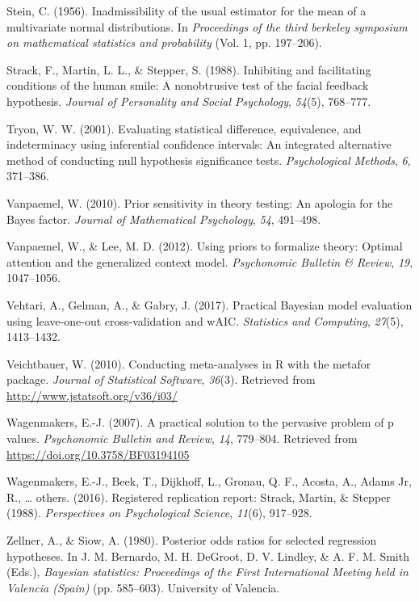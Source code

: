 \documentclass[english,man]{apa6}
\theoremstyle{definition}
\theoremstyle{definition}
\theoremstyle{remark}
\begin{document}
\hypertarget{ref-Stein:1956}{}
Stein, C. (1956). Inadmissibility of the usual estimator for the mean of
a multivariate normal distributions. In \emph{Proceedings of the third
berkeley symposium on mathematical statistics and probability} (Vol. 1,
pp. 197--206).

\hypertarget{ref-Strack:etal:1988}{}
Strack, F., Martin, L. L., \& Stepper, S. (1988). Inhibiting and
facilitating conditions of the human smile: A nonobtrusive test of the
facial feedback hypothesis. \emph{Journal of Personality and Social
Psychology}, \emph{54}(5), 768--777.

\hypertarget{ref-Tryon:2001}{}
Tryon, W. W. (2001). Evaluating statistical difference, equivalence, and
indeterminacy using inferential confidence intervals: An integrated
alternative method of conducting null hypothesis significance tests.
\emph{Psychological Methods}, \emph{6}, 371--386.

\hypertarget{ref-Vanpaemel:2010}{}
Vanpaemel, W. (2010). Prior sensitivity in theory testing: An apologia
for the Bayes factor. \emph{Journal of Mathematical Psychology},
\emph{54}, 491--498.

\hypertarget{ref-Vanpaemel:Lee:2012}{}
Vanpaemel, W., \& Lee, M. D. (2012). Using priors to formalize theory:
Optimal attention and the generalized context model. \emph{Psychonomic
Bulletin \& Review}, \emph{19}, 1047--1056.

\hypertarget{ref-Vehtari:etal:2017}{}
Vehtari, A., Gelman, A., \& Gabry, J. (2017). Practical Bayesian model
evaluation using leave-one-out cross-validation and wAIC.
\emph{Statistics and Computing}, \emph{27}(5), 1413--1432.

\hypertarget{ref-Veichtbauer:2010}{}
Veichtbauer, W. (2010). Conducting meta-analyses in R with the metafor
package. \emph{Journal of Statistical Software}, \emph{36}(3). Retrieved
from \url{http://www.jstatsoft.org/v36/i03/}

\hypertarget{ref-Wagenmakers:2007}{}
Wagenmakers, E.-J. (2007). A practical solution to the pervasive problem
of p values. \emph{Psychonomic Bulletin and Review}, \emph{14},
779--804. Retrieved from \url{https://doi.org/10.3758/BF03194105}

\hypertarget{ref-Wagenmakers:etal:2016}{}
Wagenmakers, E.-J., Beek, T., Dijkhoff, L., Gronau, Q. F., Acosta, A.,
Adams Jr, R., \ldots{} others. (2016). Registered replication report:
Strack, Martin, \& Stepper (1988). \emph{Perspectives on Psychological
Science}, \emph{11}(6), 917--928.

\hypertarget{ref-Zellner:Siow:1980}{}
Zellner, A., \& Siow, A. (1980). Posterior odds ratios for selected
regression hypotheses. In J. M. Bernardo, M. H. DeGroot, D. V. Lindley,
\& A. F. M. Smith (Eds.), \emph{Bayesian statistics: Proceedings of the
First International Meeting held in Valencia (Spain)} (pp. 585--603).
University of Valencia.
\end{document}
